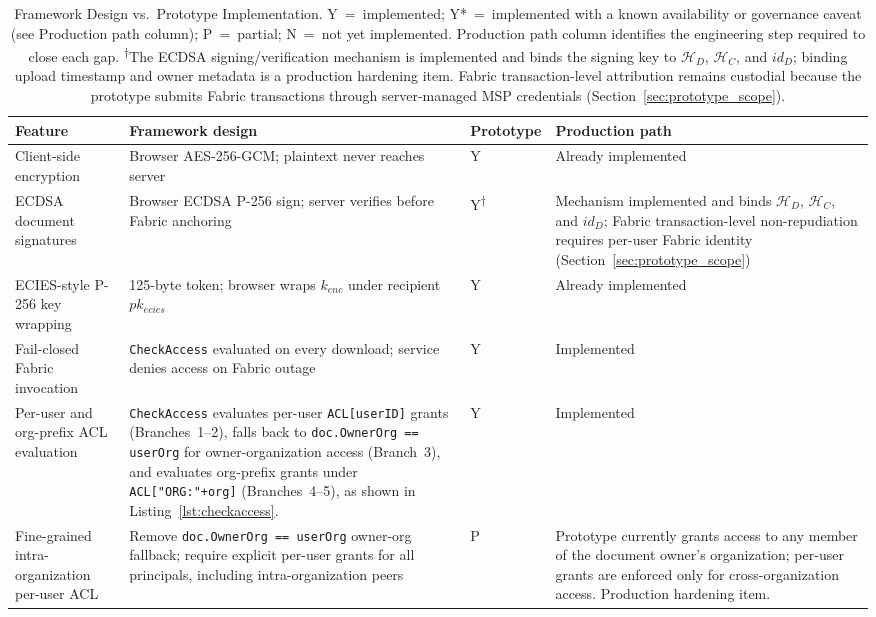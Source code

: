 \documentclass{ieeeaccess}
\begin{document}
\begin{table}[!t]
\centering
\caption{Framework Design vs.\ Prototype Implementation. Y~=~implemented;
Y*~=~implemented with a known availability or governance caveat (see Production path column);
P~=~partial; N~=~not yet implemented. Production path column
identifies the engineering step required to close each gap.
\textsuperscript{$\dagger$}The ECDSA signing/verification mechanism is
implemented and binds the signing key to $\mathcal{H}_D$, $\mathcal{H}_C$,
and $id_D$; binding upload timestamp and owner metadata is a production
hardening item. Fabric transaction-level attribution remains custodial
because the prototype submits Fabric transactions through
server-managed MSP credentials (Section~\ref{sec:prototype_scope}).}
\label{tab:framework_vs_prototype}
\renewcommand{\arraystretch}{1.25}
\small
\begin{tabularx}{\textwidth}{|p{3cm}|X|p{1.4cm}|X|}
\hline
\textbf{Feature} & \textbf{Framework design} &
\textbf{Proto\-type} & \textbf{Production path} \\
\hline
Client-side encryption & Browser AES-256-GCM; plaintext never reaches server & Y & Already implemented \\
\hline
ECDSA document signatures &
Browser ECDSA P-256 sign; server verifies before Fabric anchoring &
Y\textsuperscript{$\dagger$} &
Mechanism implemented and binds $\mathcal{H}_D$, $\mathcal{H}_C$, and $id_D$; Fabric transaction-level non-repudiation requires per-user Fabric identity (Section~\ref{sec:prototype_scope}) \\
\hline
ECIES-style P-256 key wrapping &
125-byte token; browser wraps $k_{enc}$ under recipient $pk_{ecies}$ &
Y &
Already implemented \\
\hline
Fail-closed Fabric invocation &
\texttt{CheckAccess} evaluated on every download; service denies access on Fabric outage &
Y &
Implemented \\
\hline
Per-user and org-prefix ACL evaluation &
\texttt{CheckAccess} evaluates per-user \texttt{ACL[userID]} grants (Branches~1--2), falls back to \texttt{doc.OwnerOrg == userOrg} for owner-organization access (Branch~3), and evaluates org-prefix grants under \texttt{ACL["ORG:"+org]} (Branches~4--5), as shown in Listing~\ref{lst:checkaccess}. &
Y &
Implemented \\
\hline
Fine-grained intra-organization per-user ACL &
Remove \texttt{doc.OwnerOrg == userOrg} owner-org fallback; require explicit per-user grants for all principals, including intra-organization peers &
P &
Prototype currently grants access to any member of the document owner's organization; per-user grants are enforced only for cross-organization access. Production hardening item. \\

\end{tabularx}
\end{table}
\end{document}
